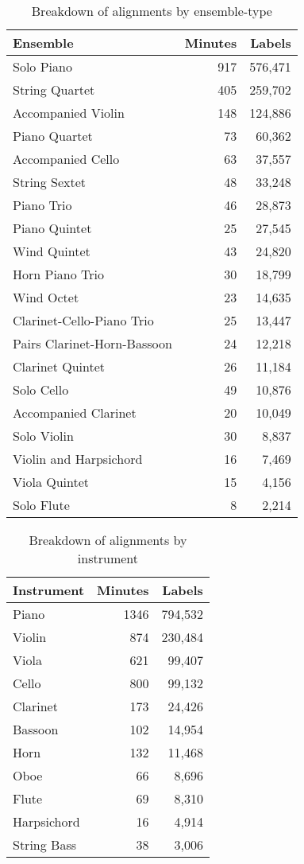 \documentclass{article} \usepackage{iclr2017_conference,times}
\begin{document}
\begin{table}[h]
  \caption{Breakdown of alignments by ensemble-type}
  \label{ensemble-table}
  \centering
  \begin{tabular}{lrr}
    \toprule
    \cmidrule{1-3}
    Ensemble     & Minutes & Labels \\
    \midrule
Solo Piano&917& 576,471\\
String Quartet&405&259,702 \\
Accompanied Violin&148&124,886 \\
Piano Quartet&73&60,362 \\
Accompanied Cello&63&37,557 \\
String Sextet&48&33,248 \\
Piano Trio&46&28,873 \\
Piano Quintet&25&27,545 \\
Wind Quintet&43&24,820 \\
Horn Piano Trio&30&18,799\\
Wind Octet&23&14,635 \\
Clarinet-Cello-Piano Trio&25&13,447 \\
Pairs Clarinet-Horn-Bassoon&24&12,218 \\
Clarinet Quintet&26& 11,184\\
Solo Cello&49&10,876 \\
Accompanied Clarinet&20&10,049 \\
Solo Violin&30&8,837 \\
Violin and Harpsichord&16&7,469\\
Viola Quintet&15&4,156 \\
Solo Flute&8&2,214 \\

    \bottomrule
  \end{tabular}
\end{table}

\begin{table}[t]
  \caption{Breakdown of alignments by instrument}
  \label{instrument-table}
  \centering
  \begin{tabular}{lrr}
    \toprule
    \cmidrule{1-3}
    Instrument     & Minutes & Labels \\
    \midrule
Piano& 1346 & 794,532\\
Violin& 874 & 230,484\\
Viola& 621 & 99,407\\
Cello& 800 & 99,132\\
Clarinet& 173 & 24,426\\
Bassoon& 102 & 14,954\\
Horn& 132 & 11,468\\
Oboe& 66 & 8,696\\
Flute& 69 & 8,310\\
Harpsichord& 16 & 4,914\\
String Bass& 38 & 3,006\\
    \bottomrule
  \end{tabular}
\end{table}
\end{document}
